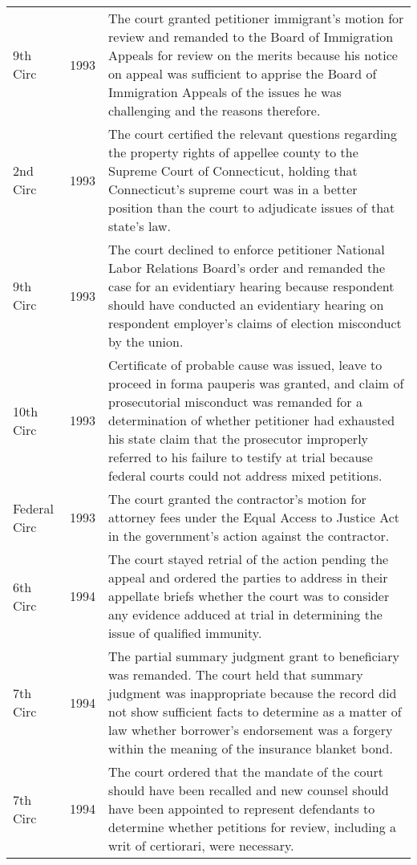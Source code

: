 \documentclass[10pt, letterpaper]{article}
\begin{document}
\begin{spacing}{1.0}
\begin{small}
\begin{longtable}[H]{llp{5in}}
    9th Circ & 1993 & The court granted petitioner immigrant's motion for review and remanded to the Board of Immigration Appeals for review on the merits because his notice on appeal was sufficient to apprise the Board of Immigration Appeals of the issues he was challenging and the reasons therefore.\\[4pt]
    2nd Circ & 1993 & The court certified the relevant questions regarding the property rights of appellee county to the Supreme Court of Connecticut, holding that Connecticut's supreme court was in a better position than the court to adjudicate issues of that state's law.\\[4pt]
    9th Circ & 1993 & The court declined to enforce petitioner National Labor Relations Board's order and remanded the case for an evidentiary hearing because respondent should have conducted an evidentiary hearing on respondent employer's claims of election misconduct by the union.\\[4pt]
    10th Circ & 1993 & Certificate of probable cause was issued, leave to proceed in forma pauperis was granted, and claim of prosecutorial misconduct was remanded for a determination of whether petitioner had exhausted his state claim that the prosecutor improperly referred to his failure to testify at trial because federal courts could not address mixed petitions.\\[4pt]
    Federal Circ & 1993 & The court granted the contractor's motion for attorney fees under the Equal Access to Justice Act in the government's action against the contractor.\\[4pt]
    6th Circ & 1994 & The court stayed retrial of the action pending the appeal and ordered the parties to address in their appellate briefs whether the court was to consider any evidence adduced at trial in determining the issue of qualified immunity.\\[4pt]
    7th Circ & 1994 & The partial summary judgment grant to beneficiary was remanded. The court held that summary judgment was inappropriate because the record did not show sufficient facts to determine as a matter of law whether borrower's endorsement was a forgery within the meaning of the insurance blanket bond.\\[4pt]
    7th Circ & 1994 & The court ordered that the mandate of the court should have been recalled and new counsel should have been appointed to represent defendants to determine whether petitions for review, including a writ of certiorari, were necessary.\\[4pt]

\end{longtable}
\end{small}
\end{spacing}
\end{document}
